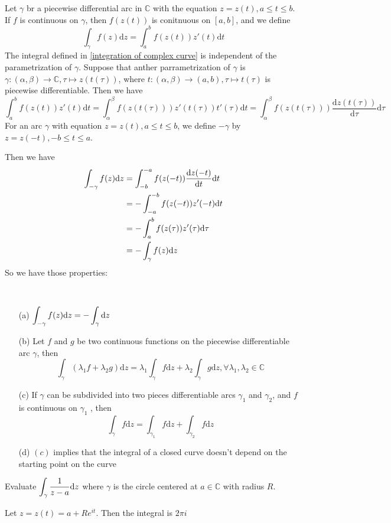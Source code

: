 Let  $ \gamma $ br a piecewise differential arc in  $ \mathbb{C} $ with the equation  $ z=z(t),a \leq t \leq b $. If  $ f  $ is continuous on  $ \gamma $, then  $ f(z(t)) $ is conitnuous on  $ [a,b] $, and we define
\begin{equation}
    \int_\gamma f(z)\mathrm{d}z=\int_a^bf(z(t))z'(t)\mathrm{d}t\label{integration of complex curve}
\end{equation}  
The integral defined in \ref{integration of complex curve} is independent of the parametrization of  $ \gamma $. Suppose that anther parrametrization of  $ \gamma $ is  $ \gamma:(\alpha,\beta)\rightarrow \mathbb{C} ,\tau\mapsto z(t(\tau))$, where  $ t:(\alpha,\beta)\rightarrow (a,b),\tau\mapsto t(\tau) $ is piecewise differentiable. Then we have
\begin{equation}
    \int_a^b f(z(t))z'(t)\mathrm{d}t=\int_\alpha^\beta f(z(t(\tau)))z'(t(\tau))t'(\tau)\mathrm{d}t=\int_\alpha^\beta f(z(t(\tau)))\frac{\mathrm{d}z(t(\tau))}{\mathrm{d}\tau}\mathrm{d}\tau
\end{equation}
\newline
For an arc  $ \gamma $ with equation  $ z=z(t),a \leq t \leq b $, we define  $ -\gamma $ by  $ z=z(-t),-b \leq t \leq a $.

Then we have 
\begin{align*}
    \int_{-\gamma}f(z)\mathrm{d}z&=\int_{-b}^{-a}f(z(-t))\displaystyle\frac{\mathrm{d}z(-t)}{\mathrm{d}t}\mathrm{d}t\\
    &=-\int_{-a}^{-b}f(z(-t))z'(-t)\mathrm{d}t\\
    &=-\int_{a}^bf(z(\tau))z'(\tau)\mathrm{d}\tau\\
    &=-\int_\gamma f(z)\mathrm{d}z
\end{align*}
So we have those properties:
\begin{proposition}
    \,
    \begin{enumerate}
        \item[(a)]  $ \displaystyle\int_{-\gamma}f(z)\mathrm{d}z=-\int_\gamma\mathrm{d}z $
        \item[(b)] Let  $ f $ and  $ g $ be two continuous functions on the piecewise differentiable arc  $ \gamma $, then 
        \[\int_\gamma(\lambda_1f+\lambda_2g)\mathrm{d}z=\lambda_1\int_\gamma f\mathrm{d}z+\lambda_2\int_\gamma g\mathrm{d}z,\forall \lambda_1,\lambda_2\in\mathbb{C}\]      
        \item[(c)] If  $ \gamma $ can be subdivided into two pieces differentiable arcs  $ \gamma_1 $ and  $ \gamma_2 $, and  $ f $ is continuous on  $ \gamma_1 $ , then
        \[\int_\gamma f\mathrm{d}z=\int_{\gamma_1} f\mathrm{d}z+\int_{\gamma_2} f\mathrm{d}z\]
        \item[(d)]  $ (c) $ implies that the integral of a closed curve doesn't depend on the starting point on the curve 
    \end{enumerate}
\end{proposition}
\begin{example}
    Evaluate  $ \displaystyle\int_\gamma\frac{1}{z-a}\mathrm{d}z $ where  $ \gamma $ is the circle centered at  $ a\in\mathbb{C} $ with radius  $ R $. 
    
    Let  $ z=z(t)=a+Re^{it} $. Then the integral is  $ 2\pi i $  
\end{example}

